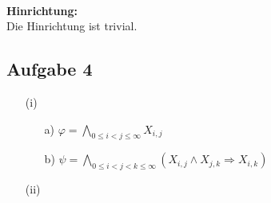 \documentclass[a4paper,10pt]{article}
\begin{document}
	\ \\ \textbf{Hinrichtung:} \\
	Die Hinrichtung ist trivial.
	
	\subsection*{Aufgabe 4}
	\begin{enumerate}
	\item[(i)]
		\begin{enumerate}
		\item[a)]
		\(\varphi = \bigwedge\limits_{0 \leq i < j \leq \infty} X_{i,j} \)
						
		\item[b)]
		\( \psi = \bigwedge\limits_{0 \leq i < j < k \leq \infty}(X_{i,j} \wedge X_{j,k} \Rightarrow X_{i,k}) \)
		
		\end{enumerate}
	\item[(ii)]

	\end{enumerate}
\end{document}
